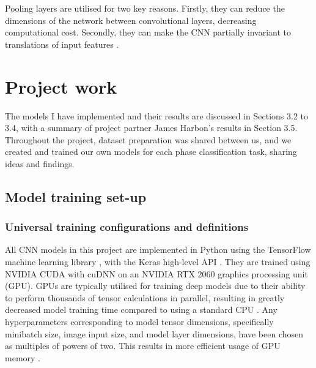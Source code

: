 \documentclass[12pt]{article}
\begin{document}
Pooling layers are utilised for two key reasons. Firstly, they can reduce the dimensions of the network between convolutional layers, decreasing computational cost. Secondly, they can make the CNN partially invariant to translations of input features \cite{Aghdam17, Goodfellow16}.
\section{Project work}
The models I have implemented and their results are discussed in Sections 3.2 to 3.4, with a summary of project partner James Harbon's results in Section 3.5. Throughout the project, dataset preparation was shared between us, and we created and trained our own models for each phase classification task, sharing ideas and findings.  
\subsection{Model training set-up}
\subsubsection{Universal training configurations and definitions}
All CNN models in this project are implemented in Python using the TensorFlow machine learning library \cite{Abadi16}, with the Keras high-level API \cite{Gulli17}. They are trained using NVIDIA CUDA with cuDNN \cite{Cook12} on an NVIDIA RTX 2060 graphics processing unit (GPU). GPUs are typically utilised for training deep models due to their ability to perform thousands of tensor calculations in parallel, resulting in greatly decreased model training time compared to using a standard CPU \cite{Shi16, Goodfellow16}. Any hyperparameters corresponding to model tensor dimensions, specifically minibatch size, image input size, and model layer dimensions, have been chosen as multiples of powers of two. This results in more efficient usage of GPU memory \cite{Goodfellow16}. 
\end{document}
